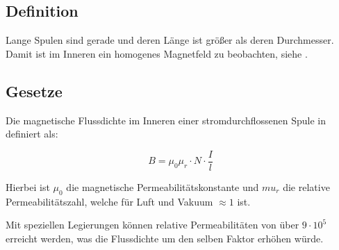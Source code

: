 \subsection{Definition}

Lange Spulen sind gerade und deren Länge ist größer als deren Durchmesser. Damit ist im Inneren ein homogenes Magnetfeld zu beobachten, siehe .


\subsection{Gesetze}

Die magnetische Flussdichte im Inneren einer stromdurchflossenen Spule in definiert als:

\begin{equation} \label{eq:MaFluss}
	B = 	\mu_0 \mu_r \cdot N \cdot \frac{I}{l}
\end{equation}

\noindent Hierbei ist $\mu_0$ die magnetische Permeabilitätskonstante und $mu_r$ die relative Permeabilitätszahl, welche für Luft und Vakuum $\approx 1$ ist. 

\begin{NiceToKnow}
Mit speziellen Legierungen können relative Permeabilitäten von über $9 \cdot 10^5$ erreicht werden, was die Flussdichte um den selben Faktor erhöhen würde.
\end{NiceToKnow}